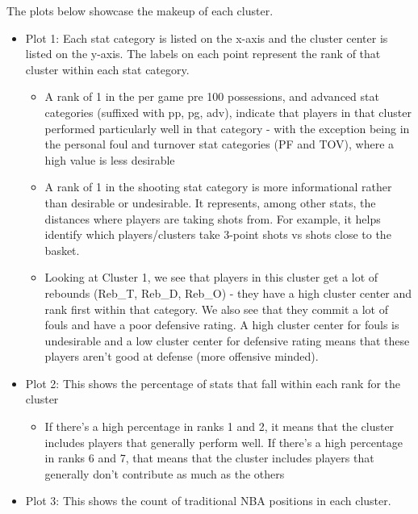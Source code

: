 \documentclass[
]{article}
\providecommand{\tightlist}{%
  \setlength{\itemsep}{0pt}\setlength{\parskip}{0pt}}
\begin{document}
The plots below showcase the makeup of each cluster.

\begin{itemize}
\tightlist
\item
  Plot 1: Each stat category is listed on the x-axis and the cluster
  center is listed on the y-axis. The labels on each point represent the
  rank of that cluster within each stat category.

  \begin{itemize}
  \tightlist
  \item
    A rank of 1 in the per game pre 100 possessions, and advanced stat
    categories (suffixed with pp, pg, adv), indicate that players in
    that cluster performed particularly well in that category - with the
    exception being in the personal foul and turnover stat categories
    (PF and TOV), where a high value is less desirable
  \item
    A rank of 1 in the shooting stat category is more informational
    rather than desirable or undesirable. It represents, among other
    stats, the distances where players are taking shots from. For
    example, it helps identify which players/clusters take 3-point shots
    vs shots close to the basket.
  \item
    Looking at Cluster 1, we see that players in this cluster get a lot
    of rebounds (Reb\_T, Reb\_D, Reb\_O) - they have a high cluster
    center and rank first within that category. We also see that they
    commit a lot of fouls and have a poor defensive rating. A high
    cluster center for fouls is undesirable and a low cluster center for
    defensive rating means that these players aren't good at defense
    (more offensive minded).
  \end{itemize}
\item
  Plot 2: This shows the percentage of stats that fall within each rank
  for the cluster

  \begin{itemize}
  \tightlist
  \item
    If there's a high percentage in ranks 1 and 2, it means that the
    cluster includes players that generally perform well. If there's a
    high percentage in ranks 6 and 7, that means that the cluster
    includes players that generally don't contribute as much as the
    others
  \end{itemize}
\item
  Plot 3: This shows the count of traditional NBA positions in each
  cluster.
\end{itemize}
\end{document}
